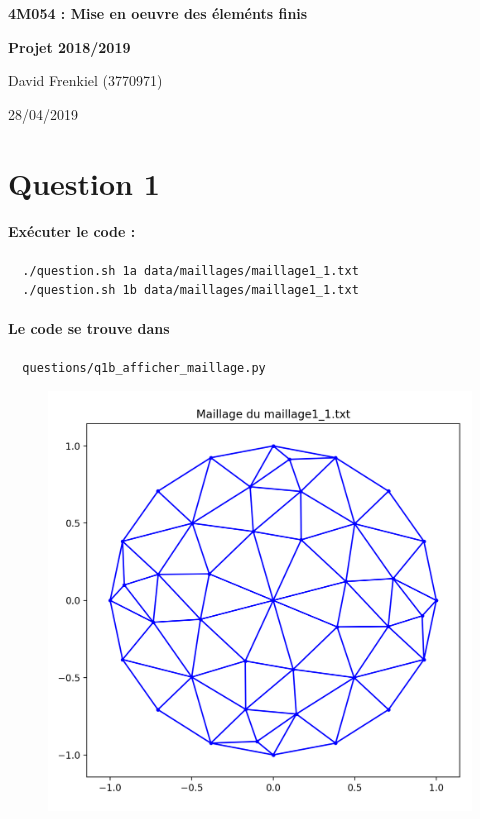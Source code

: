 \documentclass[french, 12pt, a4paper]{article}
\begin{document}

\begin{center}
{\Large\textbf{4M054 : Mise en oeuvre des éleménts finis}}

{\large\textbf{Projet 2018/2019}}

\smallskip
{\large{David Frenkiel (3770971)}}

{\large{28/04/2019}}

\end{center}
\vspace{20pt}


\section*{Question 1}

\paragraph{Exécuter le code :}
\begin{verbatim}
  ./question.sh 1a data/maillages/maillage1_1.txt
  ./question.sh 1b data/maillages/maillage1_1.txt
\end{verbatim}

\paragraph{Le code se trouve dans}
\begin{verbatim}
  questions/q1b_afficher_maillage.py
\end{verbatim}

\begin{figure}[H]
\centering
\includegraphics[scale=0.5]{figure_1b.png}
\end{figure}
\end{document}
